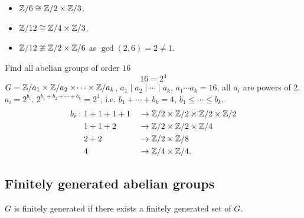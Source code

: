 \documentclass[10pt, a4paper]{article}
\begin{document}
\begin{example}
    \begin{itemize}
        \item $\mathbb{Z} / 6 \cong \mathbb{Z} / 2 \times \mathbb{Z} / 3$.

        \item $\mathbb{Z} / 12 \cong \mathbb{Z} / 4 \times \mathbb{Z} / 3$.
        
        \item $\mathbb{Z} / 12 \ncong \mathbb{Z} / 2 \times \mathbb{Z} / 6$ as $\gcd(2, 6) = 2 \neq 1$.
    \end{itemize}
\end{example}

\begin{example}
    Find all abelian groups of order $16$
    \[
    16 = 2 ^ 4
    \]
    $G = \mathbb{Z} / a_1 \times \mathbb{Z} / a_2 \times \dotsi \times \mathbb{Z} / a_k$,
    $a_1 \mid a_2 \mid \dotsi \mid a_k$,
    $a_1 \dotsi a_k = 16$,
    all $a_i$ are powers of $2$.
    $a_i = 2 ^ {b_i}$.
    $2 ^ {b_1 + b_2 + \dotsi + b_k} = 2 ^ 4$,
    i.e. $b_1 + \dotsi + b_k = 4$,
    $b_1 \leq \dotsi \leq b_k$.
    \begin{align*}
        b_i :\ &1 + 1 + 1 + 1 &&\to \mathbb{Z} / 2 \times \mathbb{Z} / 2  \times \mathbb{Z} / 2 \times \mathbb{Z} / 2 \\
        & 1 + 1 + 2 &&\to \mathbb{Z} / 2 \times \mathbb{Z} / 2 \times \mathbb{Z} / 4 \\
        &2 + 2 &&\to \mathbb{Z} / 2 \times \mathbb{Z} / 8 \\
        &4 &&\to \mathbb{Z} / 4 \times \mathbb{Z} / 4.
    \end{align*}
\end{example}

\subsection{Finitely generated abelian groups}

\begin{definition}
    $G$ is finitely generated if there exists a finitely generated set of $G$.
\end{definition}
\end{document}

